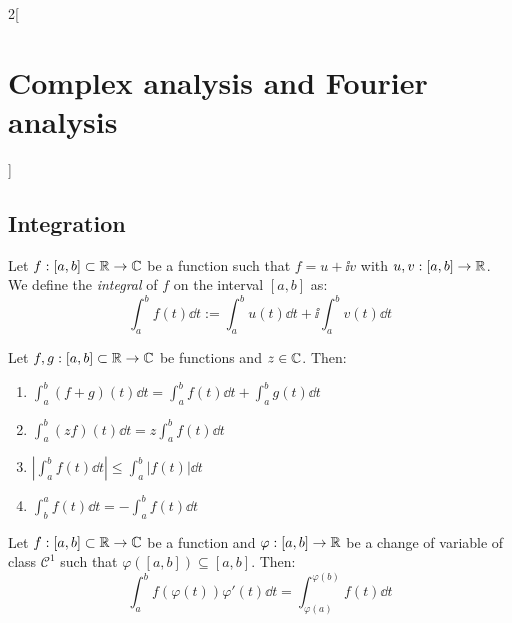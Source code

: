 \documentclass[../../../main.tex]{subfiles}
\begin{document}
\begin{multicols}{2}[\section{Complex analysis and Fourier analysis}]
  \subsection{Integration}
  \begin{definition}
    Let $f:[a,b]\subset\mathbb{R}\rightarrow\mathbb{C}$ be a function such that $f=u+\ii v$ with $u,v:[a,b]\rightarrow\mathbb{R}$. We define the \emph{integral} of $f$ on the interval $[a,b]$ as: $$\int_a^bf(t)\dd{t}:=\int_a^bu(t)\dd{t}+\ii\int_a^bv(t)\dd{t}$$
  \end{definition}
  \begin{proposition}
    Let $f,g:[a,b]\subset\mathbb{R}\rightarrow\mathbb{C}$ be functions and $z\in\mathbb{C}$. Then:
    \begin{enumerate}
      \item $\displaystyle\int_a^b(f+g)(t)\dd{t}=\int_a^bf(t)\dd{t}+\int_a^bg(t)\dd{t}$
      \item $\displaystyle\int_a^b(zf)(t)\dd{t}=z\int_a^bf(t)\dd{t}$
      \item $\displaystyle\left|\int_a^bf(t)\dd{t}\right|\leq\int_a^b|f(t)|\dd{t}$
      \item $\displaystyle \int_b^af(t)\dd{t}=-\int_a^bf(t)\dd{t}$
    \end{enumerate}
  \end{proposition}
  \begin{proposition}
    Let $f:[a,b]\subset\mathbb{R}\rightarrow\mathbb{C}$ be a function and $\varphi:[a,b]\rightarrow\mathbb{R}$ be a change of variable of class $\mathcal{C}^1$ such that $\varphi([a,b])\subseteq[a,b]$. Then: $$\int_a^bf(\varphi(t))\varphi'(t)\dd{t}=\int_{\varphi(a)}^{\varphi(b)}f(t)\dd{t}$$
  \end{proposition}

\end{multicols}
\end{document}
